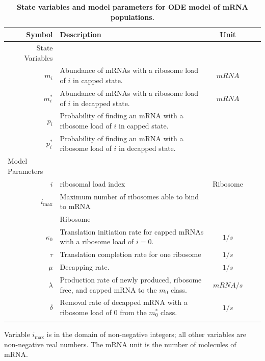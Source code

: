 \documentclass[10pt,letterpaper]{article}
\newcommand{\imax}{\ensuremath{{i_{\max}}}\xspace}
\begin{document}
\begin{table}[!ht]
  \begin{adjustwidth}{-2.25in}{0in} 
    \centering
    \caption{{\bf State variables and model parameters for ODE model of mRNA populations.}}
    \begin{tabular}{|rp{4in}|c|c|c|}
      \hline
      \textbf{Symbol}&\textbf{Description}&\textbf{Unit} \\\hline
      State Variables & &  \\ 
      \hline
      $m_i$ & Abundance of mRNAs with a ribosome load of $i$ in capped state. & $mRNA$ \\
      $m_i^*$ & Abundance of mRNAs with a ribosome load of $i$ in decapped state. & $mRNA$ \\ \hline
      $p_i$ & Probability of finding an mRNA with a ribosome load of $i$ in capped state. & \\
      $p_i^*$ & Probability of finding an mRNA with a ribosome load of $i$ in decapped state. &  \\ \hline
      \multicolumn{1}{l}{Model Parameters} \\ \hline
      $i$ & ribosomal load index & Ribosome\\
      \imax & Maximum number of ribosomes able to bind to mRNA\\ & Ribosome \\
      $\kappa_0$ & Translation initiation rate for capped mRNAs with a ribosome load of $i=0$. & $1/s$\\
      $\tau$ & Translation completion rate for one ribosome & $1/s$\\
      $\mu $ & Decapping rate. & $1/s$\\
      $\lambda$ & Production rate of newly produced, ribosome free, and capped mRNA to the $m_0$ class. & $mRNA/s$\\
      $\delta$ & Removal rate of decapped mRNA with a ribosome load of 0 from the $m_0^*$ class. & $1/s$\\ \hline 
      \\ \hline
    \end{tabular}
    \begin{flushleft}
      Variable \imax is in the domain of non-negative integers; all other variables are non-negative real numbers.
      The mRNA unit is the number of molecules of mRNA.
    \end{flushleft}
    \label{tab:params}
  \end{adjustwidth}
\end{table}
\end{document}
